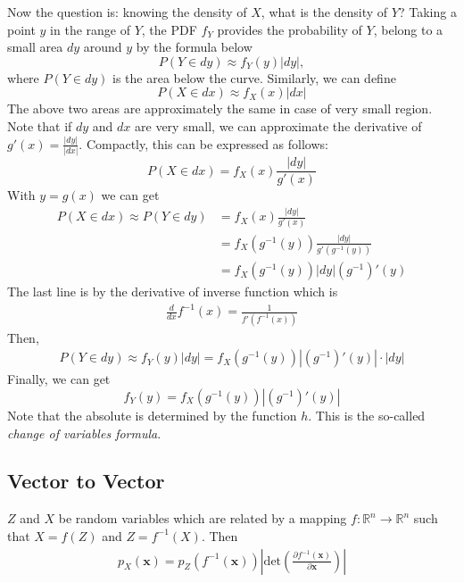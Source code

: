 Now the question is: knowing the density of $X$, what is the density of $Y$?
Taking a point $y$ in the range of $Y$, the PDF $f_Y$ provides the probability of $Y$, belong to a small area $dy$ around $y$ by the formula below
$$P(Y\in dy)\approx f_Y(y)|dy|,$$
where $P(Y\in dy)$ is the area below the curve. Similarly, we can define
$$P(X\in dx)\approx f_X(x)|dx|$$
The above two areas are approximately the same in case of very small region. Note that if $dy$ and $dx$ are very small, we can approximate the derivative of $g'(x)=\frac{|dy|}{|dx|}$. Compactly, this can be expressed as follows:
$$P(X\in dx) = f_X(x)\frac{|dy|}{g'(x)}$$
With $y=g(x)$ we can get 
\begin{align*}
	P(X\in dx)\approx P(Y\in dy) &= f_X(x)\frac{|dy|}{g'(x)}\\
	& = f_X(g^{-1}(y))\frac{|dy|}{g'(g^{-1}(y))}\\
	& = f_X(g^{-1}(y))|dy|(g^{-1})'(y)
\end{align*}
The last line is by the derivative of inverse function which is 
\begin{align*}
	\frac{d}{dx}f^{-1}(x) = \frac{1}{f'(f^{-1}(x))}
\end{align*}
Then, 
\begin{align*}
	P(Y\in dy)\approx f_Y(y)|dy| = f_X(g^{-1}(y))|(g^{-1})'(y)|\cdot |dy|
\end{align*}
Finally, we can get 
$$f_Y(y) = f_X(g^{-1}(y))|(g^{-1})'(y)|$$
Note that the absolute is determined by the function $h$. This is the so-called \textit{change of variables formula}.



\subsection{Vector to Vector}

$Z$ and $X$ be random variables which are related by a mapping $f:\mathbb{R}^n\to \mathbb{R}^n$ such that $X=f(Z)$ and $Z=f^{-1}(X)$. Then
\begin{align*}
	p_X(\mathbf{x}) = p_Z(f^{-1}(\mathbf{x})) \left\vert \text{det}\left(\frac{\partial f^{-1}(\mathbf{x})}{\partial \mathbf{x}}\right) \right\vert
\end{align*}

